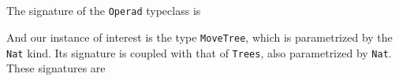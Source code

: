 \documentclass{amsart}
\begin{document}
\newpage

\subsection{} 

The signature of the \texttt{Operad} typeclass is



\bigskip
\bigskip

And our instance of interest is the type \texttt{MoveTree}, which is
parametrized by the \texttt{Nat} kind. Its signature is coupled with
that of \texttt{Trees}, also parametrized by \texttt{Nat}. These signatures
are


\end{document}
